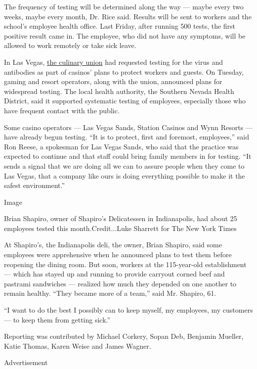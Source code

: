 The frequency of testing will be determined along the way --- maybe
every two weeks, maybe every month, Dr. Rice said. Results will be sent
to workers and the school's employee health office. Last Friday, after
running 500 tests, the first positive result came in. The employee, who
did not have any symptoms, will be allowed to work remotely or take sick
leave.

In Las Vegas,
\href{https://m.culinaryunion226.org/news/press/las-vegas-gaming-industry-to-offer-covid-19-testing-for-employees-prior-to-return-to-work}{the
culinary union} had requested testing for the virus and antibodies as
part of casinos' plans to protect workers and guests. On Tuesday, gaming
and resort operators, along with the union, announced plans for
widespread testing. The local health authority, the Southern Nevada
Health District, said it supported systematic testing of employees,
especially those who have frequent contact with the public.

Some casino operators --- Las Vegas Sands, Station Casinos and Wynn
Resorts --- have already begun testing. ``It is to protect, first and
foremost, employees,'' said Ron Reese, a spokesman for Las Vegas Sands,
who said that the practice was expected to continue and that staff could
bring family members in for testing. ``It sends a signal that we are
doing all we can to assure people when they come to Las Vegas, that a
company like ours is doing everything possible to make it the safest
environment.''

Image

Brian Shapiro, owner of Shapiro's Delicatessen in Indianapolis, had
about 25 employees tested this month.Credit...Luke Sharrett for The New
York Times

At Shapiro's, the Indianapolis deli, the owner, Brian Shapiro, said some
employees were apprehensive when he announced plans to test them before
reopening the dining room. But soon, workers at the 115-year-old
establishment --- which has stayed up and running to provide carryout
corned beef and pastrami sandwiches --- realized how much they depended
on one another to remain healthy. ``They became more of a team,'' said
Mr. Shapiro, 61.

``I want to do the best I possibly can to keep myself, my employees, my
customers --- to keep them from getting sick.''

Reporting was contributed by Michael Corkery, Sopan Deb, Benjamin
Mueller, Katie Thomas, Karen Weise and James Wagner.

Advertisement

